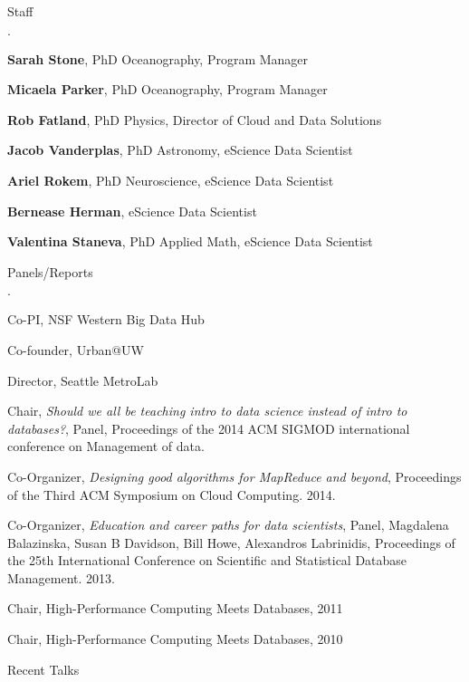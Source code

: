 \documentclass[10pt]{article}
\newenvironment{bulletlist}
   {
      \begin{list}
         {$\cdot$}
         {
            \setlength{\itemsep}{.5ex}
            \setlength{\parsep}{0ex}
            \setlength{\leftmargin}{0.7em}
            \setlength{\parskip}{0ex}
            \setlength{\topsep}{0ex}
         }
   }
   {
      \end{list}
   }
\newcommand{\marginlabel}[1]{
\begin{minipage}[b]{0.8\labelwidth}{\large \textsf{\textbf{#1}}}\end{minipage}}
\newcommand{\entrylabel}[1]{\mbox{\marginlabel{#1}}\hfill}
\newcommand{\MainListlabel}[1]
   {
      \parbox[t]{\labelwidth}{\hspace{.8em}\marginlabel{#1}}
   }
\newenvironment{MainList}[1]
   {
      \renewcommand{\entrylabel}{\MainListlabel}
      \begin{list}{}
      {
         \renewcommand{\makelabel}{\entrylabel}
         \setlength   {\itemindent}{-.65em}
         \setlength   {\labelwidth}{#1}
         \setlength   {\leftmargin}{\labelwidth}
         \setlength   {\itemsep}{3ex}
      }
   }
   {
      \end{list}
   }
\begin{document}
\begin{MainList}{88pt}
\item [Staff]
\begin{bulletlist}
\item {\bf Sarah Stone}, PhD Oceanography, Program Manager
\item {\bf Micaela Parker}, PhD Oceanography, Program Manager
\item {\bf Rob Fatland}, PhD Physics, Director of Cloud and Data Solutions
\item {\bf Jacob Vanderplas}, PhD Astronomy, eScience Data Scientist 
\item {\bf Ariel Rokem}, PhD Neuroscience, eScience Data Scientist 
\item {\bf Bernease Herman}, eScience Data Scientist
\item {\bf Valentina Staneva}, PhD Applied Math, eScience Data Scientist
\end{bulletlist}


\item [Panels/Reports]
\begin{bulletlist}
\item Co-PI, NSF Western Big Data Hub
\item Co-founder, Urban@UW
\item Director, Seattle MetroLab
\item Chair, {\em Should we all be teaching intro to data science instead of intro to databases?}, Panel, Proceedings of the 2014 ACM SIGMOD international conference on Management of data.
\item Co-Organizer, {\em Designing good algorithms for MapReduce and beyond}, Proceedings of the Third ACM Symposium on Cloud Computing. 2014.
\item Co-Organizer, {\em Education and career paths for data scientists}, Panel, Magdalena Balazinska, Susan B Davidson, Bill Howe, Alexandros Labrinidis, Proceedings of the 25th International Conference on Scientific and Statistical Database Management. 2013.
\item Chair, High-Performance Computing Meets Databases, 2011
\item Chair, High-Performance Computing Meets Databases, 2010
\end{bulletlist}

\item [Recent Talks]


\end{MainList}
\end{document}
